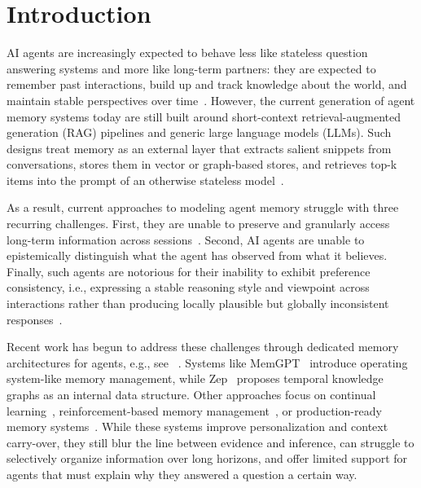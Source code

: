 \section{Introduction}
AI agents are increasingly expected to behave less like stateless question answering systems and more like long-term partners: they are expected to remember past interactions, build up and track knowledge about the world, and maintain stable perspectives over time~\cite{packer2023memgpt,rasmussen2025zep}. However, 
the current generation of agent
memory systems 
today are still built around short-context retrieval-augmented generation (RAG) pipelines and generic large language models (LLMs). Such designs
treat memory as an external layer that extracts salient snippets
from conversations, stores them in vector or graph-based stores, and retrieves top-k
items into the prompt of an otherwise stateless model~\cite{wu2024longmemeval,maharana2024evaluating}. 

As a result, current approaches
to modeling agent memory
struggle with three recurring challenges.
First, they are  unable to preserve
and granularly access
long-term information across sessions~\cite{tavakoli2025beyond,ai2025memorybench}. Second, AI agents are
unable to epistemically
distinguish what the agent has observed from what it believes. Finally,
such agents are notorious for
their inability to exhibit preference consistency, i.e., expressing a stable reasoning style and viewpoint across interactions rather than producing locally plausible but globally inconsistent responses~\cite{huang2025llms}.

Recent work has begun to address these challenges through dedicated memory architectures for agents, e.g., see ~\cite{zhang2025survey,wu2025human}. Systems like MemGPT~\cite{packer2023memgpt} introduce operating system-like memory management, while Zep~\cite{rasmussen2025zep} proposes temporal knowledge graphs as an internal data structure. Other approaches focus on continual learning~\cite{ai2025memorybench}, reinforcement-based memory management~\cite{yan2025memory}, or production-ready memory systems~\cite{chhikara2025mem0}. 
While these systems improve personalization and context carry-over, they still blur the line between evidence and inference, can struggle to selectively organize information over long horizons, and offer limited support for agents that must explain why they answered a question a certain way.

